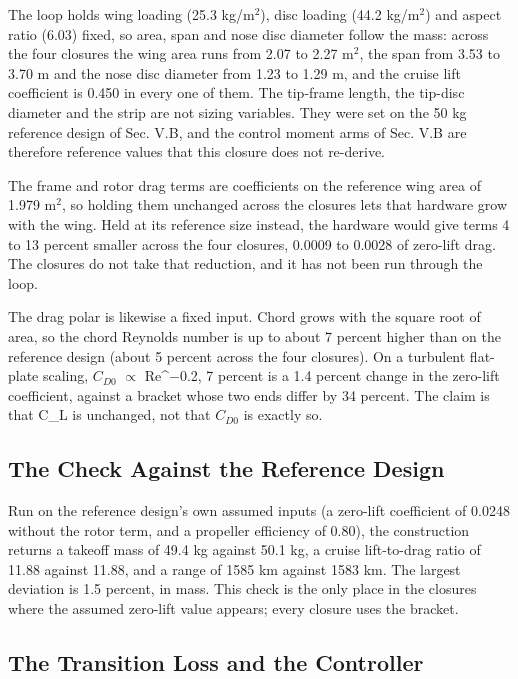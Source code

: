 \documentclass[journal]{new-aiaa}
\begin{document}
The loop holds wing loading (25.3 kg/m$^2$), disc loading (44.2 kg/m$^2$) and aspect ratio (6.03) fixed, so area, span and nose disc diameter follow the mass: across the four closures the wing area runs from 2.07 to 2.27 m$^2$, the span from 3.53 to 3.70 m and the nose disc diameter from 1.23 to 1.29 m, and the cruise lift coefficient is 0.450 in every one of them. The tip-frame length, the tip-disc diameter and the strip are not sizing variables. They were set on the 50 kg reference design of Sec. V.B, and the control moment arms of Sec. V.B are therefore reference values that this closure does not re-derive.

The frame and rotor drag terms are coefficients on the reference wing area of 1.979 m$^2$, so holding them unchanged across the closures lets that hardware grow with the wing. Held at its reference size instead, the hardware would give terms 4 to 13 percent smaller across the four closures, 0.0009 to 0.0028 of zero-lift drag. The closures do not take that reduction, and it has not been run through the loop.

The drag polar is likewise a fixed input. Chord grows with the square root of area, so the chord Reynolds number is up to about 7 percent higher than on the reference design (about 5 percent across the four closures). On a turbulent flat-plate scaling, $C_{D0}$ $\propto$ Re\^{}$-$0.2, 7 percent is a 1.4 percent change in the zero-lift coefficient, against a bracket whose two ends differ by 34 percent. The claim is that C\_L is unchanged, not that $C_{D0}$ is exactly so.

\subsection*{The Check Against the Reference Design}

Run on the reference design's own assumed inputs (a zero-lift coefficient of 0.0248 without the rotor term, and a propeller efficiency of 0.80), the construction returns a takeoff mass of 49.4 kg against 50.1 kg, a cruise lift-to-drag ratio of 11.88 against 11.88, and a range of 1585 km against 1583 km. The largest deviation is 1.5 percent, in mass. This check is the only place in the closures where the assumed zero-lift value appears; every closure uses the bracket.

\subsection*{The Transition Loss and the Controller}
\end{document}
